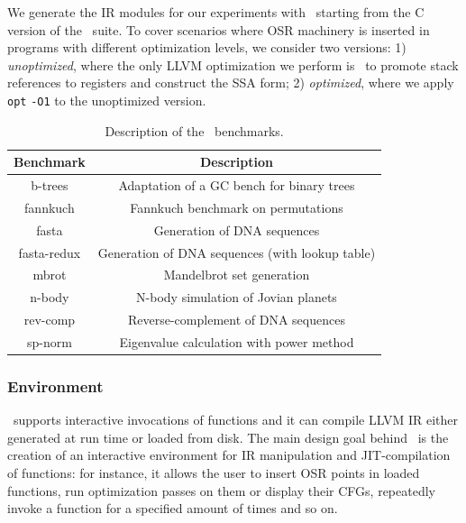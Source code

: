 We generate the IR modules for our experiments with \clang\ starting from the C version of the \shootout\ suite. To cover scenarios where OSR machinery is inserted in programs with different optimization levels, we consider two versions: 1) {\em unoptimized}, where the only LLVM optimization we perform is \memtoreg\ to promote stack references to registers and construct the SSA form; 2) {\em optimized}, where we apply {\tt opt} {\tt -O1} to the unoptimized version.

\begin{table}[!hb]
\begin{center}
\begin{small}
    \begin{tabular}{ |c|c| }
        \hline
        Benchmark & Description \\
        \hline
        \hline
        b-trees & Adaptation of a GC bench for binary trees \\
        \hline
        fannkuch & Fannkuch benchmark on permutations \\
        \hline
        fasta & Generation of DNA sequences \\
        \hline
        fasta-redux & Generation of DNA sequences (with lookup table) \\
        \hline
        mbrot & Mandelbrot set generation \\
        \hline
        n-body & N-body simulation of Jovian planets \\
        \hline
        rev-comp & Reverse-complement of DNA sequences \\
        \hline
        sp-norm & Eigenvalue calculation with power method \\
        \hline
    \end{tabular}
\end{small}
\end{center}
\caption{\label{tab:osr-shootout} Description of the \shootout\ benchmarks.}
\end{table}

\subsubsection*{Environment}
\tinyvm\ supports interactive invocations of functions and it can compile LLVM IR either generated at run time or loaded from disk. The main design goal behind \tinyvm\ is the creation of an interactive environment for IR manipulation and JIT-compilation of functions: for instance, it allows the user to insert OSR points in loaded functions, run optimization passes on them or display their CFGs, repeatedly invoke a function for a specified amount of times and so on.

